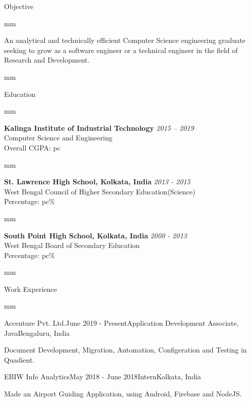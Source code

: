 \documentclass{resume}
\begin{document}
\begin{rSection}{Objective}
	
	 mm
	
	An analytical and technically efficient Computer Science engineering graduate seeking to grow as a software engineer or a technical engineer in the field of Research and Development. 
	
\end{rSection}

 mm


\begin{rSection}{Education}
	
 mm

{\bf Kalinga Institute of Industrial Technology} \hfill {\em 2015 – 2019} \\ 
Computer Science and Engineering\\
Overall CGPA: pc

 mm

{\bf St. Lawrence High School, Kolkata, India} \hfill {\em 2013 - 2015} \\ 
West Bengal Council of Higher Secondary Education(Science)\\
Percentage: pc\% 

 mm

{\bf South Point High School, Kolkata, India} \hfill {\em  2000 - 2013} \\ 
West Bengal Board of Secondary Education \\
Percentage: pc\% 

\end{rSection}

 mm

\begin{rSection}{Work Experience}
	
	 mm

\begin{rSubsection}{Accenture Pvt. Ltd.}{June 2019 - Present}{Application Development Associate, Java}{Bengaluru, India}
	\item Document Development, Migration, Automation, Configeration and Testing in Quadient.
\end{rSubsection}
	
\begin{rSubsection}{EBIW Info Analytics}{May 2018 - June 2018}{Intern}{Kolkata, India}
\item Made an Airport Guiding Application, using Android, Firebase and NodeJS.
\end{rSubsection}
\end{rSection}
\end{document}
